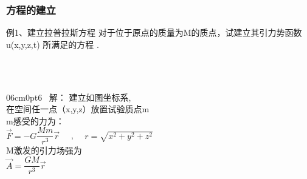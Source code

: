 \begin{frame}
	\frametitle{方程的建立}
	\begin{exampleblock} {例1、建立拉普拉斯方程}
		对于位于原点的质量为M的质点，试建立其引力势函数
		u(x,y,z,t) 所满足的方程 .
	\end{exampleblock}
	\opencutright 
	\def\windowpagestuff{\flushright 
	\begin{tikzpicture}
		\def\k{1.5}
		\draw [ ->] (0,0,0) --  (0,0,2.5)  node[below] {$z$};
		\draw [ ->]  (0,0,0) -- (\k, 0,0)   node[right] {$x$};
		\draw [ ->]  (0,0,0) -- (0,\k, 0)    node[right] {$y$};
		\fill[black!100] (0,0,0) node[right]{$M$} circle(0.8ex);
		\begin{scope}[canvas is zy plane at x=0] \draw (0,0) circle (1cm);
			\draw (-1,0) -- (1,0) (0,-1) -- (0,1);
		\end{scope};
		\begin{scope}[canvas is zx plane at y=0] \draw (0,0) circle (1cm);
			\draw (-1,0) -- (1,0) (0,-1) -- (0,1);
		\end{scope};
		\begin{scope}[canvas is xy plane at z=0] \draw (0,0) circle (1cm);
			\draw (-1,0) -- (1,0) (0,-1) -- (0,1);
		\end{scope};
	\end{tikzpicture}	}
	~~~\hspace*{\fill} \\	
	~~~\hspace*{\fill} \\	
	\begin{cutout} {0}{6cm}{0pt}{6}
		\alert{ 解：}	建立如图坐标系,\\
		在空间任一点（x,y,z）放置试验质点m\\
 		m感受的力为：\\
		{$ \overrightarrow{F} =-G\dfrac{Mm}{r^3} \overrightarrow {r} $ }  ~~,~~ $r=\sqrt{x^2+y^2+z^2}$\\ 
		M激发的引力场强为 \\
		{ $ \overrightarrow{A} =\dfrac{GM}{r^3} \overrightarrow{r} $ }\\
	\end{cutout}
\end{frame}	

